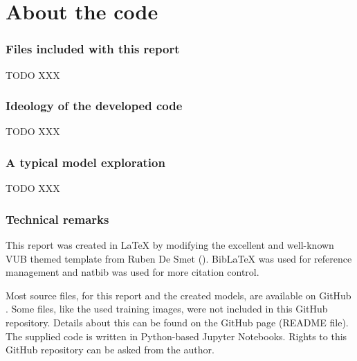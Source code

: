 \part{About the code}
\label{part:about_the_code}


\section{Files included with this report}
\label{section:inc_files}
TODO XXX

\section{Ideology of the developed code}
\label{section:ideology_dev_code}
TODO XXX

\section{A typical model exploration}
\label{section:typical_model_exploration}
TODO XXX


\section{Technical remarks}
\label{section:technical_remarks}

This report was created in \LaTeX{} by modifying the excellent and well-known VUB themed template from Ruben De Smet (\citeyear{latex_template}). BibLaTeX was used for reference management and natbib was used for more citation control. 

Most source files, for this report and the created models, are available on GitHub \citep{github_project}. Some files, like the used training images, were not included in this GitHub repository. Details about this can be found on the GitHub page (README file). The supplied code is written in Python-based Jupyter Notebooks. Rights to this GitHub repository can be asked from the author.